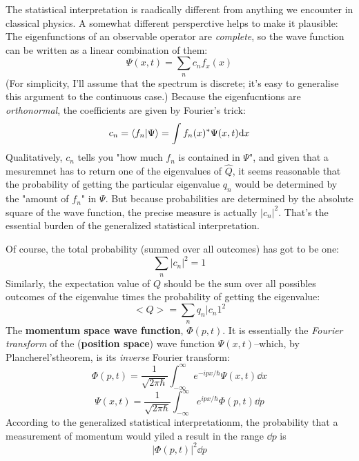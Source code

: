 The statistical interpretation is raadically different from anything we encounter in classical physics. A somewhat different persperctive helps to make it plausible:
The eigenfunctions of an observable operator are \textit{complete}, so the wave function can be written as a linear combination of them:
\begin{equation}\label{3.45}
	\Psi(x,t)=\sum_nc_nf_x(x)
\end{equation}
(For simplicity, I'll assume that the spectrum is discrete; it's easy to generalise this argument to the continuous case.) Because the eigenfucntions are \textit{orthonormal}, the coefficients are given by Fourier's trick:
\begin{equation}\label{3.46}
	c_n=\braket{f_n}{\Psi}=\int f_n(x)^*\Psi(x,t)\dd x
\end{equation}
Qualitatively, $c_n$ tells you "how much $f_n$ is contained in $\Psi$", and given that a mesuremnet has to return one of the eigenvalues of $\hat{Q}$, it seems reasonable that the probability of getting the particular eigenvalue $q_n$ would be determined by the "amount of $f_n$" in $\Psi$. But because probabilities are determined by the absolute square of the wave function, the precise measure is actually $|c_n|^2$. That's the essential burden of the generalized statistical interpretation.

Of course, the total probability (summed over all outcomes) has got to be one:
\begin{equation}\label{3.47}
	\sum_n|c_n|^2=1
\end{equation}
Similarly, the expectation value of $Q$ should be the sum over all possibles outcomes of the eigenvalue times the probability of getting the eigenvalue:
\begin{equation}\label{3.49}
	<Q>=\sum_nq_n|c_n1^2
\end{equation}
The \textbf{momentum space wave function}, $\Phi(p,t)$. It is essentially the \textit{Fourier transform} of the (\textbf{position space}) wave function $\Psi(x,t)$--which, by Plancherel'stheorem, is its \textit{inverse} Fourier transform:
\begin{equation}\label{3.54}
\Phi(p,t)=\frac{1}{\sqrt{2\pi\hbar}}\int_{-\infty}^\infty e^{-ipx/\hbar}\Psi(x,t)\dd x
\end{equation}
\begin{equation}\label{3.55}
	\Psi(x,t)=\frac{1}{\sqrt{2\pi\hbar}}\int_{-\infty}^\infty e^{ipx/\hbar}\Phi(p,t)\dd p
\end{equation}
According to the generalized statistical interpretationm, the probability that a measurement of momentum would yiled a result in the range $\dd p$ is
\begin{equation}\label{3.56}
	|\Phi(p,t)|^2\dd p
\end{equation}

